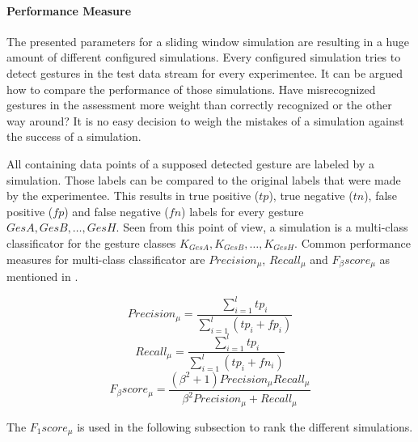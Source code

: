 \paragraph{Performance Measure} \label{performance_measure}
The presented parameters for a sliding window simulation are resulting in a huge amount of different configured
simulations. Every configured simulation tries to detect gestures in the test data stream for every experimentee. It can
be argued how to compare the performance of those simulations. Have misrecognized gestures in the assessment more weight
than correctly recognized or the other way around? It is no easy decision to weigh the mistakes of a simulation against
the success of a simulation.

All containing data points of a supposed detected gesture are labeled by a simulation. Those labels can be compared
to the original labels that were made by the experimentee. This results in true positive ($tp$), true negative
($tn$), false positive ($fp$) and false negative ($fn$) labels for every gesture $GesA, GesB, \dots, GesH$. Seen from
this point of view, a simulation is a multi-class classificator for the gesture classes
$K_{GesA}, K_{GesB}, \dots, K_{GesH}$. Common performance measures for multi-class classificator are $Precision_{\mu}$,
$Recall_{\mu}$ and $F_{\beta}score_{\mu}$ as mentioned in \cite{sokolova2009systematic}.

\begin{equation}
    Precision_{\mu} = \frac{\sum \limits_{i=1}^{l} tp_i}{\sum \limits_{i=1}^{l} (tp_i + fp_i)}
\end{equation}
\begin{equation}
    Recall_{\mu} = \frac{\sum \limits_{i=1}^{l} tp_i}{\sum \limits_{i=1}^{l} (tp_i + fn_i)}
\end{equation}
\begin{equation}
    F_{\beta}score_{\mu} = \frac{(\beta^2 + 1)Precision_{\mu} Recall_{\mu}}{\beta^2 Precision_{\mu} + Recall_{\mu}}
\end{equation}

The $F_{1}score_{\mu}$ is used in the following subsection to rank the different simulations.
